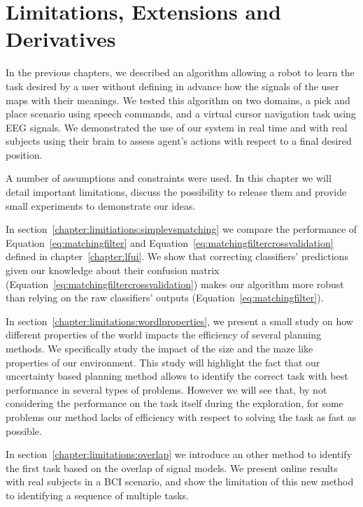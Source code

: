 
%
\chapter{Limitations, Extensions and Derivatives}
\label{chapter:limitations}
\minitoc

In the previous chapters, we described an algorithm allowing a robot to learn the task desired by a user without defining in advance how the signals of the user maps with their meanings. We tested this algorithm on two domains, a pick and place scenario using speech commands, and a virtual cursor navigation task using EEG signals. We demonstrated the use of our system in real time and with real subjects using their brain to assess agent's actions with respect to a final desired position.

A number of assumptions and constraints were used. In this chapter we will detail important limitations, discuss the possibility to release them and provide small experiments to demonstrate our ideas. 

In section~\ref{chapter:limitiations:simplevsmatching} we compare the performance of Equation~\ref{eq:matchingfilter} and Equation~\ref{eq:matchingfiltercrossvalidation} defined in chapter~\ref{chapter:lfui}. We show that correcting classifiers' predictions given our knowledge about their confusion matrix (Equation~\ref{eq:matchingfiltercrossvalidation}) makes our algorithm more robust than relying on the raw classifiers' outputs (Equation~\ref{eq:matchingfilter}).

In section~\ref{chapter:limitations:wordlproperties}, we present a small study on how different properties of the world impacts the efficiency of several planning methods. We specifically study the impact of the size and the maze like properties of our environment. This study will highlight the fact that our uncertainty based planning method allows to identify the correct task with best performance in several types of problems. However we will see that, by not considering the performance on the task itself during the exploration, for some problems our method lacks of efficiency with respect to solving the task as fast as possible.

In section~\ref{chapter:limitations:overlap} we introduce an other method to identify the first task based on the overlap of signal models. We present online results with real subjects in a BCI scenario, and show the limitation of this new method to identifying a sequence of multiple tasks.

